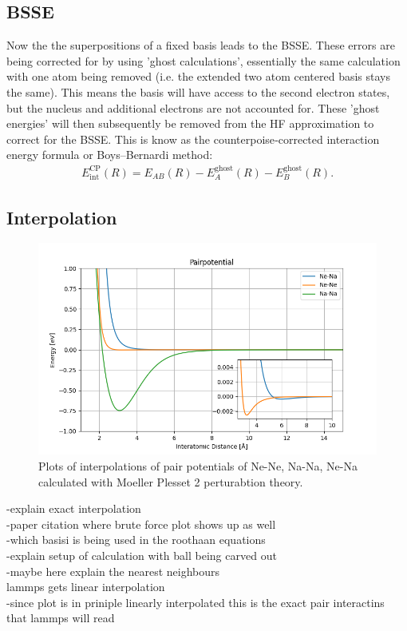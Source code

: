 \subsection{\ac{BSSE}}
Now the the superpositions of a fixed basis leads to the \ac{BSSE}. These errors are being corrected for by using 'ghost calculations', essentially the same calculation with one atom being removed (i.e. the extended two atom centered basis stays the same). This means the basis will have access to the second electron states, but the nucleus and additional electrons are not accounted for. These 'ghost energies' will then subsequently be removed from the \ac{HF}
approximation to correct for the \ac{BSSE}.
This is know as the counterpoise‐corrected interaction energy formula or Boys–Bernardi method: %
\begin{align}
	E_{\text {int}}^{\text {CP}}(R)=E_{A B}(R)-E_A^{\text {ghost}}(R)-E_B^{\text {ghost}}(R).
\end{align}
\subsection{Interpolation}

\begin{figure}[h!]
	\centering
	\includegraphics[scale = 0.7]{Inhalt/Bilder/pairpotential.png}
	\caption{Plots of interpolations of pair potentials of Ne-Ne, Na-Na, Ne-Na calculated with Moeller Plesset 2 perturabtion theory.}
	\label{fig:pairpotential}
\end{figure}
-explain exact interpolation\\
-paper citation where brute force plot shows up as well\\
-which basisi is being used in the roothaan equations \\
-explain setup of calculation with ball being carved out\\
-maybe here explain the nearest neighbours\\
lammps gets linear interpolation\\
-since plot is in priniple linearly interpolated this is the exact pair interactins that lammps will read
